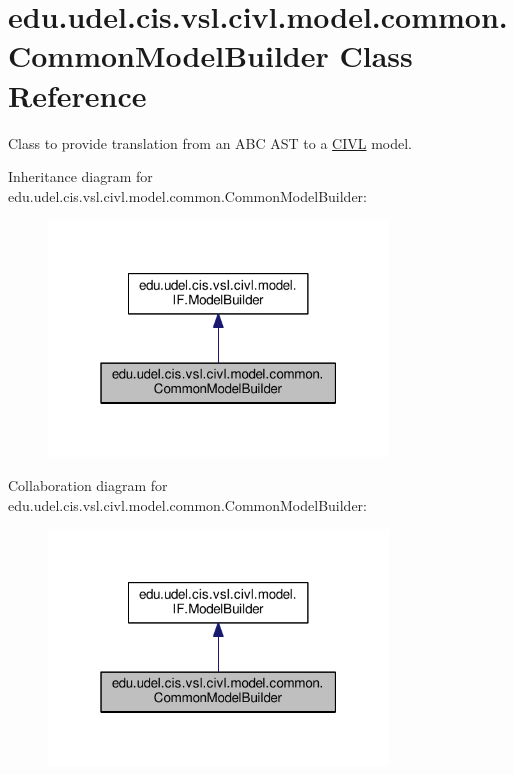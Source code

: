 \hypertarget{classedu_1_1udel_1_1cis_1_1vsl_1_1civl_1_1model_1_1common_1_1CommonModelBuilder}{}\section{edu.\+udel.\+cis.\+vsl.\+civl.\+model.\+common.\+Common\+Model\+Builder Class Reference}
\label{classedu_1_1udel_1_1cis_1_1vsl_1_1civl_1_1model_1_1common_1_1CommonModelBuilder}


Class to provide translation from an A\+B\+C A\+S\+T to a \hyperlink{classedu_1_1udel_1_1cis_1_1vsl_1_1civl_1_1CIVL}{C\+I\+V\+L} model.  




Inheritance diagram for edu.\+udel.\+cis.\+vsl.\+civl.\+model.\+common.\+Common\+Model\+Builder\+:
\nopagebreak
\begin{figure}[H]
\begin{center}
\leavevmode
\includegraphics[width=256pt]{classedu_1_1udel_1_1cis_1_1vsl_1_1civl_1_1model_1_1common_1_1CommonModelBuilder__inherit__graph}
\end{center}
\end{figure}


Collaboration diagram for edu.\+udel.\+cis.\+vsl.\+civl.\+model.\+common.\+Common\+Model\+Builder\+:
\nopagebreak
\begin{figure}[H]
\begin{center}
\leavevmode
\includegraphics[width=256pt]{classedu_1_1udel_1_1cis_1_1vsl_1_1civl_1_1model_1_1common_1_1CommonModelBuilder__coll__graph}
\end{center}
\end{figure}
